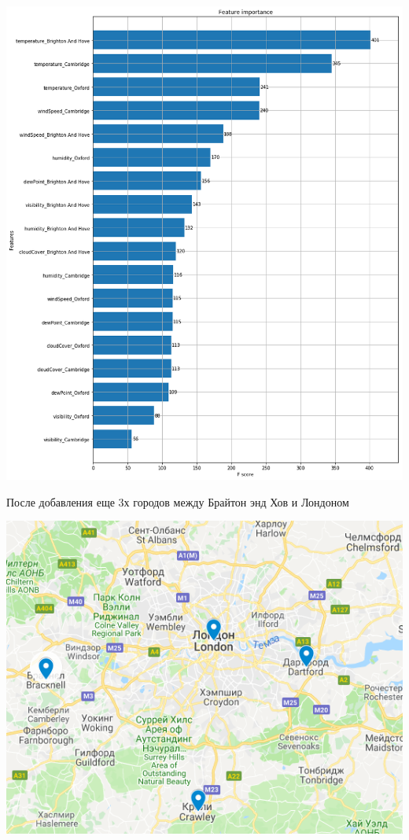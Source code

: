 \documentclass[11pt]{article}
\begin{document}
\begin{center}
\includegraphics[width=15cm]{./pics/xgboost_feature_importance_3_cities.png}
\end{center}

После добавления еще 3х городов между Брайтон энд Хов и Лондоном


\begin{center}
\includegraphics[width=15cm]{./pics/dartford_crawley_brancknell.png}
\end{center}
\end{document}
